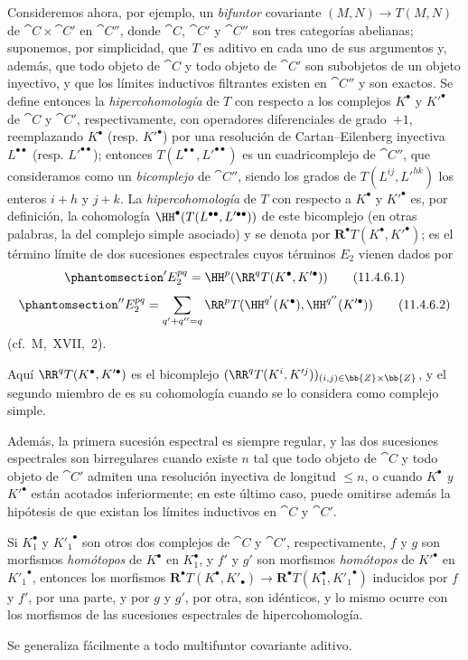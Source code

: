 \documentclass[oneside]{amsart}
\renewcommand{\leq}{\leqslant}
\newcommand{\oldpage}[2][]{{\marginnote{\normalfont\textbf{#1}~|~#2}}\ignorespaces}
\let\EGAOriginalLabel\label
\renewcommand{\label}[1]{\phantomsection\EGAOriginalLabel{#1}}
\begin{document}
\begin{env}[11.4.6]
\label{0.11.4.6}
Consideremos ahora, por ejemplo, un \emph{bifuntor} covariante $(M, N) \rightarrow T(M, N)$ de $\cat{C} \times \cat{C}'$ en $\cat{C}''$, donde $\cat{C}$, $\cat{C}'$ y $\cat{C}''$ son tres categorías abelianas;
suponemos, por simplicidad, que $T$ es aditivo en cada uno de sus argumentos y, además, que todo objeto de $\cat{C}$ y todo objeto de $\cat{C}'$ son subobjetos de un objeto inyectivo,
y que los límites inductivos filtrantes existen en $\cat{C}''$ y son exactos.
Se define entonces la \emph{hipercohomología} de $T$ con respecto a los complejos $K^\bullet$ y $K'^\bullet$ de $\cat{C}$ y $\cat{C}'$, respectivamente, con operadores diferenciales de grado~$+1$, reemplazando $K^\bullet$ (resp. $K'^\bullet$) por una resolución de Cartan--Eilenberg inyectiva $L^{\bullet\bullet}$ (resp. $L'^{\bullet\bullet}$);
entonces $T(L^{\bullet\bullet}, L'^{\bullet\bullet})$ es un cuadricomplejo de $\cat{C}''$, que consideramos como un \emph{bicomplejo} de $\cat{C}''$, siendo los grados de $T(L^{ij}, L'^{hk})$ los enteros $i+h$ y $j+k$.
La \emph{hipercohomología} de $T$ con respecto a $K^\bullet$ y $K'^\bullet$ es, por definición, la cohomología $\HH^\bullet(T(L^{\bullet\bullet}, L'^{\bullet\bullet}))$ de este bicomplejo (en otras palabras, la del complejo simple asociado) y se denota por $\mathbf{R}^\bullet T(K^\bullet, K'^\bullet)$;
\oldpage[0\textsubscript{III}]{35}
es el término límite de dos sucesiones espectrales cuyos términos $E_2$ vienen dados por
\[
\label{0.11.4.6.1}
  'E_2^{pq}
  = \HH^p(\RR^q T(K^\bullet, K'^\bullet))
\tag{11.4.6.1}
\]
\[
\label{0.11.4.6.2}
  ''E_2^{pq}
  = \sum_{q'+q''=q}\RR^p T(\HH^{q'}(K^\bullet),\HH^{q''}(K'^\bullet))
\tag{11.4.6.2}
\]
(cf.~M,~XVII,~2).

Aquí $\RR^q T(K^\bullet, K'^\bullet)$ es el bicomplejo $(\RR^q T(K^i, K'^j))_{(i,j)\in \bb{Z}\times \bb{Z}}$, y el segundo miembro de  es su cohomología cuando se lo considera como complejo simple.

Además, la primera sucesión espectral es siempre regular, y las dos sucesiones espectrales son birregulares cuando existe $n$ tal que todo objeto de $\cat{C}$ y todo objeto de $\cat{C}'$ admiten una resolución inyectiva de longitud $\leq n$, o cuando $K^\bullet$ \emph{y} $K'^\bullet$ están acotados inferiormente;
en este último caso, puede omitirse además la hipótesis de que existan los límites inductivos en $\cat{C}$ y $\cat{C}'$.

Si $K_1^\bullet$ y ${K'_1}^\bullet$ son otros dos complejos de $\cat{C}$ y $\cat{C}'$, respectivamente, $f$ y $g$ son morfismos \emph{homótopos} de $K^\bullet$ en $K_1^\bullet$,
y $f'$ y $g'$ son morfismos \emph{homótopos} de $K'^\bullet$ en ${K'_1}^\bullet$, entonces los morfismos $\mathbf{R}^\bullet  T(K^\bullet, K'_\bullet) \rightarrow \mathbf{R}^\bullet  T(K_1^\bullet, {K'_1}^\bullet)$ inducidos por $f$ y $f'$, por una parte, y por $g$ y $g'$, por otra, son idénticos, y lo mismo ocurre con los morfismos de las sucesiones espectrales de hipercohomología.

Se generaliza fácilmente a todo multifuntor covariante aditivo.
\end{env}
\end{document}
